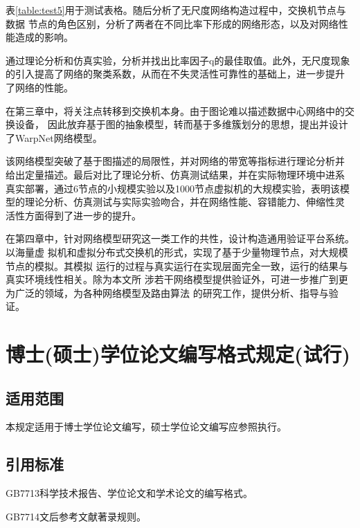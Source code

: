 \documentclass[oneside, phd]{njuthesis}
\begin{document}
表\ref{table:test5}用于测试表格。随后分析了无尺度网络构造过程中，交换机节点与数据
节点的角色区别，分析了两者在不同比率下形成的网络形态，以及对网络性能造成的影响。

通过理论分析和仿真实验，分析并找出比率因子q的最佳取值。此外，无尺度现象
的引入提高了网络的聚类系数，从而在不失灵活性可靠性的基础上，进一步提升
了网络的性能。

在第三章中，将关注点转移到交换机本身。由于图论难以描述数据中心网络中的交换设备，
因此放弃基于图的抽象模型，转而基于多维簇划分的思想，提出并设计了WarpNet网络模型。

该网络模型突破了基于图描述的局限性，并对网络的带宽等指标进行理论分析并
给出定量描述。最后对比了理论分析、仿真测试结果，并在实际物理环境中进系
真实部署，通过6节点的小规模实验以及1000节点虚拟机的大规模实验，表明该模
型的理论分析、仿真测试与实际实验吻合，并在网络性能、容错能力、伸缩性灵
活性方面得到了进一步的提升。

在第四章中，针对网络模型研究这一类工作的共性，设计构造通用验证平台系统。以海量虚
拟机和虚拟分布式交换机的形式，实现了基于少量物理节点，对大规模节点的模拟。其模拟
运行的过程与真实运行在实现层面完全一致，运行的结果与真实环境线性相关。除为本文所
涉若干网络模型提供验证外，可进一步推广到更为广泛的领域，为各种网络模型及路由算法
的研究工作，提供分析、指导与验证。


\appendix

\chapter{博士(硕士)学位论文编写格式规定(试行)}

\section{适用范围}

本规定适用于博士学位论文编写，硕士学位论文编写应参照执行。

\section{引用标准}

GB7713科学技术报告、学位论文和学术论文的编写格式。

GB7714文后参考文献著录规则。
\end{document}
